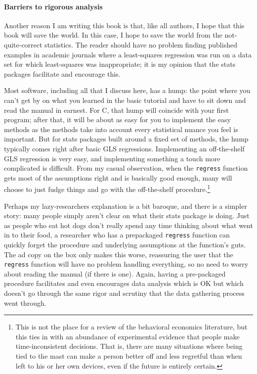 {\paragraph{Barriers to rigorous analysis}
Another reason I am writing this book is that, like all authors, I hope
that this book will save the world. In this case, I hope to save the
world from the not-quite-correct statistics.  The reader should have
no problem finding published examples in academic journals where a
least-squares regression was run on a data set for which least-squares
was inappropriate; it is my opinion that the stats packages facilitate
and encourage this.

Most software, including all that I discuss here, has a hump: the
point where you can't get by on what you learned in the basic tutorial
and have to sit down and read the manual in earnest. For C, that hump
will coincide with your first program; after that, it will be about as
easy for you to implement the easy methods as the methods take into account
every statistical nuance you feel is important. But for stats packages
built around a fixed set of methods, the hump typically comes right after
basic GLS regressions. Implementing an off-the-shelf GLS regression
is very easy, and implementing something a touch more complicated
is difficult.  From my casual observation,
when the {\tt regress} function gets most of the assumptions right and
is basically good enough, many will choose to just fudge things and
go with the off-the-shelf procedure.\footnote{This is not the place for
a review of the behavioral economics literature, but this ties in with an abundance of experimental
evidence that people make time-inconsistent decisions. That is, there
are many situations where being tied to the mast can make a person
better off and less regretful than when left to his or her own devices,
even if the future is entirely certain.}

Perhaps my lazy-researchers explanation is a bit baroque, and there is
a simpler story: many people simply aren't clear on what their stats package is doing.
Just as people who eat hot dogs don't really spend any
time thinking about what went in to their food, a researcher who has
a prepackaged {\tt regress} function can quickly forget the procedure
and underlying assumptions at the function's guts.  The ad copy on the
box only makes this worse, reassuring the user that the {\tt regress}
function will have no problem handling everything, so no need to worry
about reading the manual (if there is one). Again, having a pre-packaged
procedure facilitates and even encourages data analysis which is OK
but which doesn't go through the same rigor and scrutiny that the data gathering
process went through.

}
